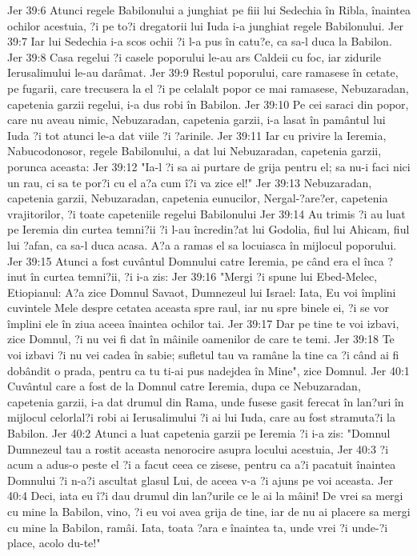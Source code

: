 Jer 39:6  Atunci regele Babilonului a junghiat pe fiii lui Sedechia în Ribla, înaintea ochilor acestuia, ?i pe to?i dregatorii lui Iuda i-a junghiat regele Babilonului.
Jer 39:7  Iar lui Sedechia i-a scos ochii ?i l-a pus în catu?e, ca sa-l duca la Babilon.
Jer 39:8  Casa regelui ?i casele poporului le-au ars Caldeii cu foc, iar zidurile Ierusalimului le-au darâmat.
Jer 39:9  Restul poporului, care ramasese în cetate, pe fugarii, care trecusera la el ?i pe celalalt popor ce mai ramasese, Nebuzaradan, capetenia garzii regelui, i-a dus robi în Babilon.
Jer 39:10  Pe cei saraci din popor, care nu aveau nimic, Nebuzaradan, capetenia garzii, i-a lasat în pamântul lui Iuda ?i tot atunci le-a dat viile ?i ?arinile.
Jer 39:11  Iar cu privire la Ieremia, Nabucodonosor, regele Babilonului, a dat lui Nebuzaradan, capetenia garzii, porunca aceasta:
Jer 39:12  "Ia-l ?i sa ai purtare de grija pentru el; sa nu-i faci nici un rau, ci sa te por?i cu el a?a cum î?i va zice el!"
Jer 39:13  Nebuzaradan, capetenia garzii, Nebuzaradan, capetenia eunucilor, Nergal-?are?er, capetenia vrajitorilor, ?i toate capeteniile regelui Babilonului
Jer 39:14  Au trimis ?i au luat pe Ieremia din curtea temni?ii ?i l-au încredin?at lui Godolia, fiul lui Ahicam, fiul lui ?afan, ca sa-l duca acasa. A?a a ramas el sa locuiasca în mijlocul poporului.
Jer 39:15  Atunci a fost cuvântul Domnului catre Ieremia, pe când era el înca ?inut în curtea temni?ii, ?i i-a zis:
Jer 39:16  "Mergi ?i spune lui Ebed-Melec, Etiopianul: A?a zice Domnul Savaot, Dumnezeul lui Israel: Iata, Eu voi împlini cuvintele Mele despre cetatea aceasta spre raul, iar nu spre binele ei, ?i se vor împlini ele în ziua aceea înaintea ochilor tai.
Jer 39:17  Dar pe tine te voi izbavi, zice Domnul, ?i nu vei fi dat în mâinile oamenilor de care te temi.
Jer 39:18  Te voi izbavi ?i nu vei cadea în sabie; sufletul tau va ramâne la tine ca ?i când ai fi dobândit o prada, pentru ca tu ti-ai pus nadejdea în Mine", zice Domnul.
Jer 40:1  Cuvântul care a fost de la Domnul catre Ieremia, dupa ce Nebuzaradan, capetenia garzii, i-a dat drumul din Rama, unde fusese gasit ferecat în lan?uri în mijlocul celorlal?i robi ai Ierusalimului ?i ai lui Iuda, care au fost stramuta?i la Babilon.
Jer 40:2  Atunci a luat capetenia garzii pe Ieremia ?i i-a zis: "Domnul Dumnezeul tau a rostit aceasta nenorocire asupra locului acestuia,
Jer 40:3  ?i acum a adus-o peste el ?i a facut ceea ce zisese, pentru ca a?i pacatuit înaintea Domnului ?i n-a?i ascultat glasul Lui, de aceea v-a ?i ajuns pe voi aceasta.
Jer 40:4  Deci, iata eu î?i dau drumul din lan?urile ce le ai la mâini! De vrei sa mergi cu mine la Babilon, vino, ?i eu voi avea grija de tine, iar de nu ai placere sa mergi cu mine la Babilon, ramâi. Iata, toata ?ara e înaintea ta, unde vrei ?i unde-?i place, acolo du-te!"
